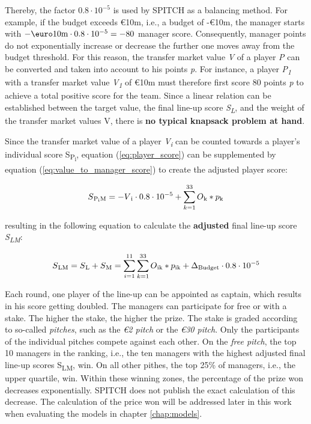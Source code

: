 Thereby, the factor $0.8\cdot10^{-5}$ is used by SPITCH as a balancing method. \parencite[cf.][]{spitch_rules_nodate} For example, if the budget exceeds €10m, i.e., a budget of -€10m, the manager starts with $-\textup{\euro}10\textup{m}\cdot0.8\cdot10^{-5} = -80$ manager score. Consequently, manager points do not exponentially increase or decrease the further one moves away from the budget threshold. For this reason, the transfer market value \emph{V} of a player \emph{P} can be converted and taken into account to his points \emph{p}. For instance, a player \emph{P\textsubscript{1}} with a transfer market value \emph{V\textsubscript{1}} of €10m must therefore first score 80 points \emph{p} to achieve a total positive score for the team. Since a linear relation can be established between the target value, the final line-up score \emph{S\textsubscript{L}}, and the weight of the transfer market values V, there is \textbf{no typical knapsack problem at hand}.

Since the transfer market value of a player \emph{V\textsubscript{i}} can be counted towards a player's individual score S\textsubscript{P\textsubscript{i}}, equation (\ref{eq:player_score}) can be supplemented by equation (\ref{eq:value_to_manager_score}) to create the adjusted player score:

\begin{equation}
    S\textsubscript{P\textsubscript{i}M} = -V\textsubscript{i}\cdot0.8\cdot10^{-5} + \sum_{k=1}^{33} O\textsubscript{k} * p\textsubscript{k}
    \label{eq:player_score_with_value}
\end{equation}

resulting in the following equation to calculate the \textbf{adjusted} final line-up score \emph{S\textsubscript{LM}}:

\begin{equation}
    S\textsubscript{LM} = S\textsubscript{L} + S\textsubscript{M} = \sum_{i=1}^{11} \sum_{k=1}^{33} O\textsubscript{ik} * p\textsubscript{ik} + \Delta \textsubscript{Budget}\cdot0.8\cdot10^{-5}
    \label{eq:final_score_with_ms}
\end{equation}

Each round, one player of the line-up can be appointed as captain, which results in his score getting doubled. The managers can participate for free or with a stake. The higher the stake, the higher the prize. The stake is graded according to so-called \emph{pitches}, such as the \emph{€2 pitch} or the \emph{€30 pitch}. Only the participants of the individual pitches compete against each other. On the \emph{free pitch}, the top 10 managers in the ranking, i.e., the ten managers with the highest adjusted final line-up scores {S\textsubscript{LM}}, win. On all other pithes, the top 25\% of managers, i.e., the upper quartile, win. Within these winning zones, the percentage of the prize won decreases exponentially. SPITCH does not publish the exact calculation of this decrease. The calculation of the price won will be addressed later in this work when evaluating the models in chapter \ref{chap:models}.